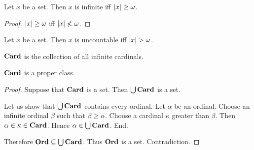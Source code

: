 \documentclass[../set-theory.tex]{subfiles}
\begin{document}
  \begin{forthel}
    \begin{proposition}
      Let $x$ be a set.
      Then $x$ is infinite iff $\left\vert x\right\vert \geq \omega$.
    \end{proposition}
    \begin{proof}
      $\left\vert x\right\vert \geq \omega$ iff $\left\vert x\right\vert \nless \omega$.
    \end{proof}
  \end{forthel}

  \begin{forthel}
    \begin{proposition}
      Let $x$ be a set.
      Then $x$ is uncountable iff $\left\vert x\right\vert > \omega$.
    \end{proposition}
  \end{forthel}

  \begin{forthel}
    \begin{definition}
      $\mathbf{Card}$ is the collection of all infinite cardinals.
    \end{definition}
  \end{forthel}

  \begin{forthel}
    \begin{proposition}
      $\mathbf{Card}$ is a proper class.
    \end{proposition}
    \begin{proof}
      Suppose that $\mathbf{Card}$ is a set.
      Then $\bigcup \mathbf{Card}$ is a set.

      Let us show that $\bigcup \mathbf{Card}$ contains every ordinal.
        Let $\alpha$ be an ordinal.
        Choose an infinite ordinal $\beta$ such that $\beta \geq \alpha$.
        Choose a cardinal $\kappa$ greater than $\beta$.
        Then $\alpha \in \kappa \in \mathbf{Card}$.
        Hence $\alpha \in \bigcup \mathbf{Card}$.
      End.

      Therefore $\mathbf{Ord} \subseteq \bigcup \mathbf{Card}$.
      Thus $\mathbf{Ord}$ is a set.
      Contradiction.
    \end{proof}
  \end{forthel}
\end{document}
